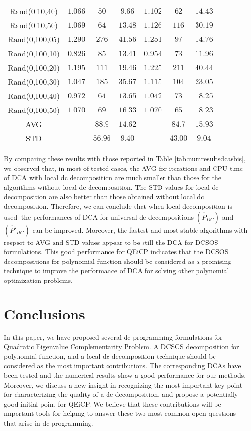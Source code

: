 \documentclass[3p]{elsarticle}
\begin{document}
\begin{table}[h!]
\begin{center}
{\begin{tabular}{c|ccc|ccc}
				Rand(0,10,40) & $1.066$ & $50$ & $9.66$ &$1.102$ & $62$ & $14.43$ \\
				Rand(0,10,50) & $1.069$ & $64$ & $13.48$ &$1.126$ & $116$ & $30.19$ \\
				\hline
				Rand(0,100,05) & $1.290$ & $276$ & $41.56$ &$1.251$ & $97$ & $14.76$ \\
				Rand(0,100,10) & $0.826$ & $85$ & $13.41$ &$0.954$ & $73$ & $11.96$ \\
				Rand(0,100,20) & $1.195$ & $111$ & $19.46$ &$1.225$ & $211$ & $40.44$ \\
				Rand(0,100,30) & $1.047$ & $185$ & $35.67$ &$1.115$ & $104$ & $23.05$ \\
				Rand(0,100,40) & $0.972$ & $64$ & $13.65$ &$1.042$ & $73$ & $18.25$ \\
				Rand(0,100,50) & $1.070$ & $69$ & $16.33$ &$1.070$ & $65$ & $18.23$ \\
				\hline
				AVG && $88.9$ & $14.62$ && $84.7$ & $15.93$\\ 
				STD	&& $56.96$ & $9.40$ && $43.00$ & $9.04$\\ 
				\hline 
			\end{tabular} 
		}
	\end{center}
\end{table}

By comparing these results with those reported in Table \ref{tab:numresultsdcasbis}, we observed that, in most of tested cases, the AVG for iterations and CPU time of DCA with local dc decomposition are much smaller than those for the algorithms without local dc decomposition. The STD values for local dc decomposition are also better than those obtained without local dc decomposition. Therefore, we can conclude that when local decomposition is used, the performances of DCA for universal dc decompositions $(\hat{P}_{DC})$ and $(\hat{P}'_{DC})$ can be improved. Moreover, the fastest and most stable algorithms with respect to AVG and STD values appear to be still the DCA for DCSOS formulations. This good performance for QEiCP indicates that the DCSOS decompositions for polynomial function should be considered as a promising technique to improve the performance of DCA for solving other polynomial optimization problems.  

\section{Conclusions}
\label{sec:conclusions}
In this paper, we have proposed several dc programming formulations for Quadratic Eigenvalue Complementarity Problem. A DCSOS decomposition for polynomial function, and a local dc decomposition technique should be considered as the most important contributions. The corresponding DCAs have been tested and the numerical results show a good performance for our methods. Moreover, we discuss a new insight in recognizing the most important key point for characterizing the quality of a dc decomposition, and propose a potentially good initial point for QEiCP. We believe that these contributions will be important tools for helping to answer these two most common open questions that arise in dc programming. 
\end{document}
